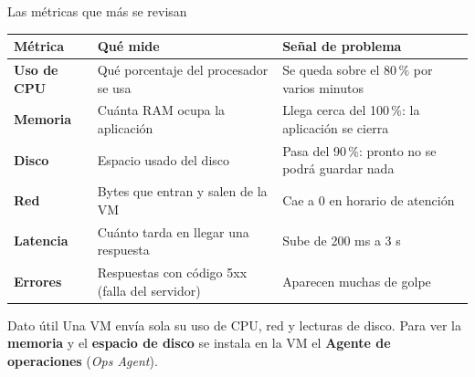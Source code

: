 \documentclass[aspectratio=169,10pt,c]{beamer}
\begin{document}
\begin{frame}{Las métricas que más se revisan}
\renewcommand{\arraystretch}{1.05}
\centering\small
\begin{tabular}{@{}p{2.6cm}>{\raggedright\arraybackslash}p{4.6cm}>{\raggedright\arraybackslash}p{5.4cm}@{}}
\toprule
\textbf{Métrica} & \textbf{Qué mide} & \textbf{Señal de problema}\\
\midrule
\textbf{Uso de CPU} & Qué porcentaje del procesador se usa & Se queda sobre el 80\,\% por varios minutos\\
\textbf{Memoria} & Cuánta RAM ocupa la aplicación & Llega cerca del 100\,\%: la aplicación se cierra\\
\textbf{Disco} & Espacio usado del disco & Pasa del 90\,\%: pronto no se podrá guardar nada\\
\textbf{Red} & Bytes que entran y salen de la VM & Cae a 0 en horario de atención\\
\textbf{Latencia} & Cuánto tarda en llegar una respuesta & Sube de 200 ms a 3 s\\
\textbf{Errores} & Respuestas con código 5xx (falla del servidor) & Aparecen muchas de golpe\\
\bottomrule
\end{tabular}
\par\vspace{2mm}
\begin{alertblock}{Dato útil}
\small Una VM envía sola su uso de CPU, red y lecturas de disco. Para ver la \textbf{memoria} y el \textbf{espacio de disco} se instala en la VM el \textbf{Agente de operaciones} (\textit{Ops Agent}).
\end{alertblock}
\end{frame}
\end{document}
